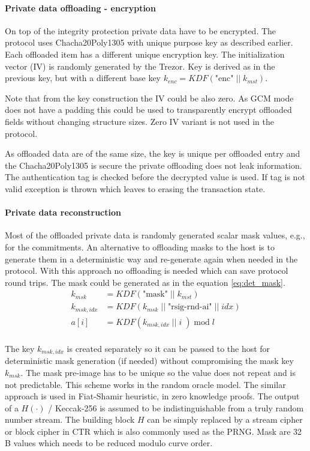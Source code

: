 \documentclass[]{article}
\begin{document}
\paragraph{Private data offloading - encryption}
On top of the integrity protection private data have to be encrypted.
The protocol uses Chacha20Poly1305 with unique purpose key as described earlier. Each offloaded item has a different unique encryption key.
The initialization vector (IV) is randomly generated by the Trezor. Key is derived as in the previous key, but with a different base key $k_{enc} = \textit{KDF}\left(\text{"enc"} \; || \; k_{mst}\right)$.

Note that from the key construction the IV could be also zero. As GCM mode does not have a padding this could be used to transparently encrypt offloaded fields without changing structure sizes. Zero IV variant is not used in the protocol.

As offloaded data are of the same size, the key is unique per offloaded entry and the Chacha20Poly1305 is secure the private offloading does not leak information. The authentication tag is checked before the decrypted value is used. If tag is not valid exception is thrown which leaves to erasing the transaction state.

\paragraph{Private data reconstruction} \label{mask_reconstruction}
Most of the offloaded private data is randomly generated scalar mask values, e.g., for the commitments. An alternative to offloading masks to the host is to generate them in a deterministic way and re-generate again when needed in the protocol. With this approach no offloading is needed which can save protocol round trips. The mask could be generated as in the equation \ref{eq:det_mask}. 
\begin{equation}
\begin{split} \label{eq:det_mask}
k_{msk} &= \textit{KDF}\left(\text{"mask"} \; || \; k_{mst}\right)\\
k_{msk,idx} &= \textit{KDF}\left(k_{msk} \; || \; \text{"rsig-rnd-ai"} \; || \; idx \right)\\
a[i] &= KDF(k_{msk,idx} \; || \; i \;) \; \text{mod} \; l  \\
\end{split}
\end{equation}

The key $k_{msk,idx}$ is created separately so it can be passed to the host for deterministic mask generation (if needed) without compromising the mask key $k_{msk}$.
The mask pre-image has to be unique so the value does not repeat and is not predictable. This scheme works in the random oracle model. The similar approach is used in Fiat-Shamir heuristic, in zero knowledge proofs. The output of a $H(\cdot)$ / Keccak-256 is assumed to be indistinguishable from a truly random number stream. The building block $H$ can be simply replaced by a stream cipher or block cipher in CTR which is also commonly used as the PRNG. Mask are 32 B values which needs to be reduced modulo curve order.
\end{document}
